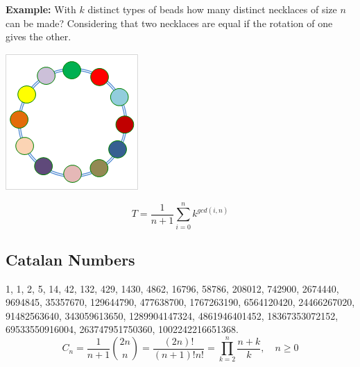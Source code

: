     \textbf{Example:} With $k$ distinct types of beads how many distinct necklaces of size $n$ can be made? Considering that two necklaces are equal if the rotation of one gives the other.
    \begin{center}
    \includegraphics[scale=.6, keepaspectratio]{img/Burnside.png}
    \end{center}
    $$T = \frac{1}{n+1} \sum_{i=0}^{n}k^{gcd(i, n)}$$
    
\subsection{Catalan Numbers}

1, 1, 2, 5, 14, 42, 132, 429, 1430, 4862, 16796, 58786, 208012, 742900, 2674440, 9694845, 35357670, 129644790, 477638700, 1767263190, 6564120420, 24466267020, 91482563640, 343059613650, 1289904147324, 4861946401452, 18367353072152, 69533550916004, 263747951750360, 1002242216651368.\\

$$C_n = \frac{1}{n+1}\binom{2n}{n} = \frac{(2n)!}{(n+1)!n!} = \prod_{k=2}^{n} \frac{n+k}{k}, \quad n \geq 0$$\\


